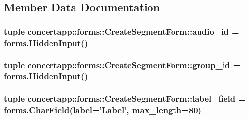 \subsection{Member Data Documentation}
\hypertarget{classconcertapp_1_1forms_1_1_create_segment_form_a4da25892ae0f466eaba6538dc213250f}{
\subsubsection[{audio\_\-id}]{\setlength{\rightskip}{0pt plus 5cm}tuple {\bf concertapp::forms::CreateSegmentForm::audio\_\-id} = forms.HiddenInput()}}
\label{classconcertapp_1_1forms_1_1_create_segment_form_a4da25892ae0f466eaba6538dc213250f}
\hypertarget{classconcertapp_1_1forms_1_1_create_segment_form_a01c2d2a5710a1e88ba34442f43860a4d}{
\subsubsection[{group\_\-id}]{\setlength{\rightskip}{0pt plus 5cm}tuple {\bf concertapp::forms::CreateSegmentForm::group\_\-id} = forms.HiddenInput()}}
\label{classconcertapp_1_1forms_1_1_create_segment_form_a01c2d2a5710a1e88ba34442f43860a4d}
\hypertarget{classconcertapp_1_1forms_1_1_create_segment_form_a343943e12b01273bf2178048f2d0cb49}{
\subsubsection[{label\_\-field}]{\setlength{\rightskip}{0pt plus 5cm}tuple {\bf concertapp::forms::CreateSegmentForm::label\_\-field} = forms.CharField(label='Label', max\_\-length=80)}}
\label{classconcertapp_1_1forms_1_1_create_segment_form_a343943e12b01273bf2178048f2d0cb49}
